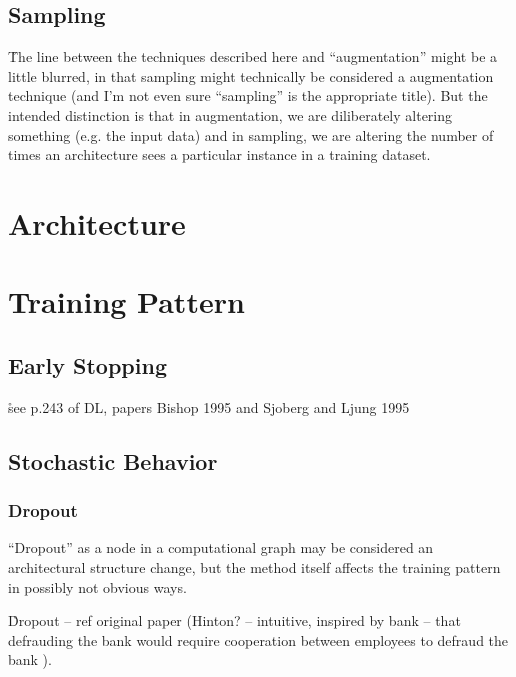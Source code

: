 \subsection{Sampling}

\r{The line between the techniques described here and ``augmentation'' might be a little blurred, in that sampling might technically be considered a augmentation technique (and I'm not even sure ``sampling'' is the appropriate title). But the intended distinction is that in augmentation, we are diliberately altering something (e.g. the input data) and in sampling, we are altering the number of times an architecture sees a particular instance in a training dataset.}




\section{Architecture}

\section{Training Pattern}

\subsection{Early Stopping}

\r{see p.243 of DL, papers Bishop 1995 and Sjoberg and Ljung 1995}



\subsection{Stochastic Behavior}

\subsubsection{Dropout}

\r{``Dropout'' as a node in a computational graph may be considered an architectural structure change, but the method itself affects the training pattern in possibly not obvious ways. }


\r{Dropout -- ref original paper (Hinton? -- intuitive, inspired by bank -- that defrauding the bank would require cooperation between employees to defraud the bank )}.

